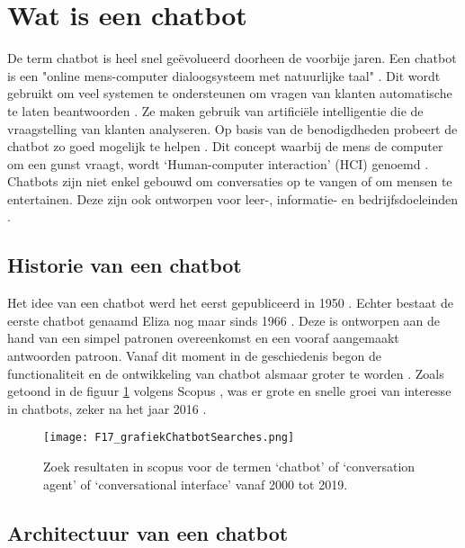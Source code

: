 \newpage


\section{Wat is een chatbot}%
\label{sec:chatbot}

De term chatbot is heel snel geëvolueerd doorheen de voorbije jaren. Een chatbot is een "online mens-computer dialoogsysteem met natuurlijke taal" \autocite{Jia2003}. Dit wordt gebruikt om veel systemen te ondersteunen om vragen van klanten automatische te laten beantwoorden \autocite{Adamopoulou2020}. Ze maken gebruik van artificiële intelligentie die de vraagstelling van klanten analyseren. Op basis van de benodigdheden probeert de chatbot zo goed mogelijk te helpen \autocite{Khanna2015}. Dit concept waarbij de mens de computer om een gunst vraagt, wordt ‘Human-computer interaction’ (HCI) genoemd \autocite{Adamopoulou2020}. Chatbots zijn niet enkel gebouwd om conversaties op te vangen of om mensen te entertainen. Deze zijn ook ontworpen voor leer-, informatie- en bedrijfsdoeleinden \autocite{Shawar2007}. 

\subsection{Historie van een chatbot}%
\label{sec:chatbotHistorie}

Het idee van een chatbot werd het eerst gepubliceerd in 1950 \autocite{Turing2009}. Echter bestaat de eerste chatbot genaamd Eliza nog maar sinds 1966 \autocite{Weizenbaum1966}. Deze is ontworpen aan de hand van een simpel patronen overeenkomst en een vooraf aangemaakt antwoorden patroon.  Vanaf dit moment in de geschiedenis begon de functionaliteit en de ontwikkeling van chatbot alsmaar groter te worden \autocite{Brandtzaeg2017}. Zoals getoond in de figuur \ref{fig:graphDocusChatbotAYear} volgens Scopus \autocite{Elsevier2004}, was er grote en snelle groei van interesse in chatbots, zeker na het jaar 2016 \autocite{Adamopoulou2020}.

\begin{figure}[h]
    \centering
    \texttt{[image: F17\_grafiekChatbotSearches.png]}
    \captionsetup{justification=ce/brntering, singlelinecheck=false}    
    \caption{Zoek resultaten in scopus voor de termen ‘chatbot’ of ‘conversation agent’ of ‘conversational interface’ vanaf 2000 tot 2019.}
    \label{fig:graphDocusChatbotAYear}
\end{figure}


\subsection{Architectuur  van een chatbot}%
\label{sec:chatbotArchitectuur}

